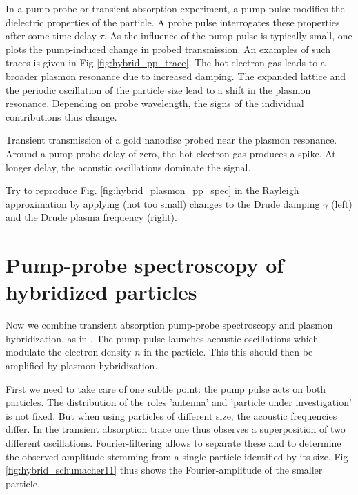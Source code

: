 In a pump-probe or transient absorption experiment, a pump pulse modifies the dielectric properties of
the particle. A probe pulse interrogates these properties after some time delay $\tau$. As the influence of the pump pulse is typically small, one plots the pump-induced change in probed transmission. An examples of such traces is given in Fig \ref{fig:hybrid_pp_trace}.  The hot electron gas leads to a broader plasmon resonance due to increased damping. The expanded lattice and the periodic oscillation of the particle size lead to a shift in the plasmon resonance. Depending  on probe wavelength, the signs of the individual contributions thus change.


\begin{marginfigure}
\caption{Transient transmission of a gold nanodisc probed near the plasmon resonance. Around a pump-probe delay of zero, the hot electron gas produces a spike. At longer delay, the acoustic oscillations dominate the signal. 
\label{fig:hybrid_pp_trace}}
\end{marginfigure}

\begin{questions}
\item Try to reproduce Fig. \ref{fig:hybrid_plasmon_pp_spec} in the Rayleigh approximation by applying (not too small) changes to the Drude damping $\gamma$ (left) and the Drude plasma frequency (right).
\end{questions}


\section{Pump-probe spectroscopy of hybridized particles}


Now we combine transient absorption pump-probe spectroscopy and plasmon hybridization, as in \cite{Schumacher11}. The pump-pulse launches acoustic oscillations which modulate the electron density $n$ in the particle. This this should then be amplified by plasmon hybridization.

First we need to take care of one subtle point: the pump pulse acts on both particles. The distribution of the roles 'antenna' and 'particle under investigation' is not fixed. But when using particles of different size, the acoustic frequencies differ. In the transient absorption trace one thus observes a superposition of two different oscillations. Fourier-filtering allows to separate these and to determine the observed amplitude stemming from a single particle identified by its size. Fig \ref{fig:hybrid_schumacher11} thus shows the Fourier-amplitude of the smaller particle.


